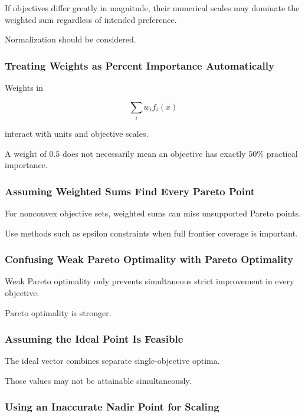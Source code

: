 If objectives differ greatly in magnitude, their numerical scales may
dominate the weighted sum regardless of intended preference.

Normalization should be considered.

\subsubsection{Treating Weights as Percent Importance Automatically}

Weights in

\[
\sum_iw_if_i(x)
\]

interact with units and objective scales.

A weight of \(0.5\) does not necessarily mean an objective has exactly
\(50\%\) practical importance.

\subsubsection{Assuming Weighted Sums Find Every Pareto Point}

For nonconvex objective sets, weighted sums can miss unsupported Pareto
points.

Use methods such as epsilon constraints when full frontier coverage is
important.

\subsubsection{Confusing Weak Pareto Optimality with Pareto Optimality}

Weak Pareto optimality only prevents simultaneous strict improvement in
every objective.

Pareto optimality is stronger.

\subsubsection{Assuming the Ideal Point Is Feasible}

The ideal vector combines separate single-objective optima.

Those values may not be attainable simultaneously.

\subsubsection{Using an Inaccurate Nadir Point for Scaling}

